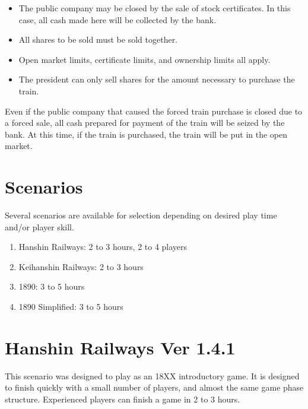 \documentclass{article}
\begin{document}
\begin{CJK}{UTF8}{min}
\begin{multicols}{2}
\begin{itemize}
\item The public company may be closed by the sale of stock
  certificates. In this case, all cash made here will be collected by
  the bank.

\item All shares to be sold must be sold together.

\item Open market limits, certificate limits, and ownership limits all apply.

\item The president can only sell shares for the amount necessary to
  purchase the train.
\end{itemize}

Even if the public company that caused the forced train purchase is closed
due to a forced sale, all cash prepared for payment of the train will
be seized by the bank. At this time, if the train is purchased, the
train will be put in the open market.


\newpage

\section*{Scenarios}

Several scenarios are available for selection depending on desired
play time and/or player skill.

\begin{enumerate}[label=\Alph*]
\item Hanshin Railways: 2 to 3 hours, 2 to 4 players
\item Keihanshin Railways: 2 to 3 hours
\item 1890: 3 to 5 hours
\item 1890 Simplified: 3 to 5 hours
\end{enumerate}

\renewcommand*{\thesection}{\Alph{section}}
\renewcommand*{\theHsection}{scenarios.\Alph{section}}
\setcounter{secnumdepth}{3}
\setcounter{section}{0}

\section{Hanshin Railways Ver 1.4.1}

This scenario was designed to play as an 18XX introductory game. It is
designed to finish quickly with a small number of players, and almost
the same game phase structure. Experienced players can finish a game
in 2 to 3 hours.


\end{multicols}
\end{CJK}
\end{document}
